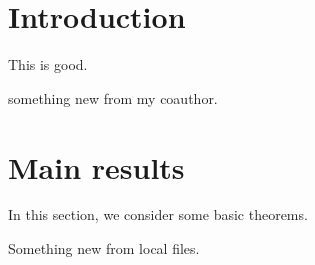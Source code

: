 \documentclass{article}
\begin{document}
\section{Introduction}%
\label{sec:introduction}



This is good. 

something new from my coauthor. 



\section{Main results}%
\label{sec:main_results}
In this section, we consider some basic theorems. 



Something new from local files. 
\end{document}
